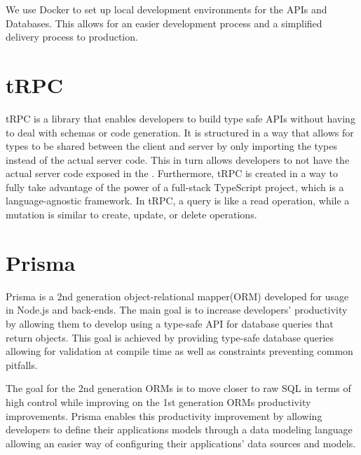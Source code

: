 We use Docker to set up local development environments for the APIs and Databases. This allows for an easier development process and a simplified delivery process to production.

\section*{tRPC}
tRPC is a library that enables developers to build type safe APIs without having to deal with schemas or code generation. 
It is structured in a way that allows for types to be shared between the client and server by only importing the types instead of the actual server code. 
This in turn allows developers to not have the actual server code exposed in the \frontend{}. 
Furthermore, tRPC is created in a way to fully take advantage of the power of a full-stack TypeScript project, which is a language-agnostic framework\cite{tRPC}.
In tRPC, a query is like a read operation, while a mutation is similar to create, update, or delete operations.

\section*{Prisma}
Prisma is a 2nd generation object-relational mapper(ORM) developed for usage in Node.js and \typescript{} back-ends. 
The main goal is to increase developers' productivity by allowing them to develop using a type-safe API for database queries that return \javascript{} objects. 
This goal is achieved by providing type-safe database queries allowing for validation at compile time as well as constraints preventing common pitfalls\cite{Prisma_Why}.

The goal for the 2nd generation ORMs is to move closer to raw SQL in terms of high control while improving on the 1st generation ORMs productivity improvements. 
Prisma enables this productivity improvement by allowing developers to define their applications models through a data modeling language allowing an easier way of configuring their applications' data sources and models\cite{Prisma_Doc}.

